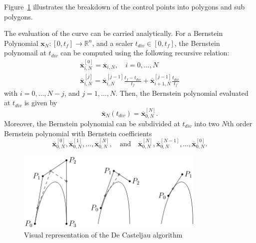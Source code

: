 Figure~\ref{fig:deCasteljau} illustrates the breakdown of the control points into polygons and sub polygons. 
\par The evaluation of the curve can be carried analytically. For a Bernstein Polynomial $\boldsymbol{x}_N:[0,t_f]\rightarrow \mathbb{R}^n$, and a scaler $t_{div}\in [0,t_f]$, the Bernstein polynomail at $t_{div}$ can be computed using the following recursive relation:
\begin{equation}
\begin{gathered}
    \overline{\boldsymbol{x}}^{[0]}_{i,N} = \overline{\boldsymbol{x}}_{i,N},\quad i=0,\dots, N  \\
    \overline{\boldsymbol{x}}^{[j]}_{i,N} = \overline{\boldsymbol{x}}^{[j-1]}_{i,N} \frac{t_f-t_{div}}{t_f} + \overline{\boldsymbol{x}}^{[j-1]}_{i+1,N} \frac{t_{div}}{t_f}
\end{gathered}
\end{equation}
with $i=0,\dots, N-j$, and $j=1,\dots, N$. Then, the Bernstein polynomial evaluated at $t_{div}$ is given by
\begin{equation}
    \overline{\boldsymbol{x}}_N(t_{div}) = \overline{\boldsymbol{x}}_{0,N}^{[N]}.
\end{equation}
Moreover, the Bernstein polynomial can be subdivided at $t_{div}$ into two $N$th order Bernstein polynomial with Bernstein coefficients
\begin{equation}
    \overline{\boldsymbol{x}}^{[0]}_{0,N}, \overline{\boldsymbol{x}}^{[1]}_{0,N}, \dots, \overline{\boldsymbol{x}}^{[N]}_{0,N}, \quad \text{and}\quad \overline{\boldsymbol{x}}^{[N]}_{0,N}, \overline{\boldsymbol{x}}^{[N-1]}_{0,N}, \dots, \overline{\boldsymbol{x}}^{[0]}_{0,N}.
\end{equation}

\begin{figure}[h!]
\centering
\includegraphics[width=0.8\textwidth]{Images/deCasteljau.png}
\caption{Visual representation of the De Casteljau algorithm}
\label{fig:deCasteljau}
\end{figure}


